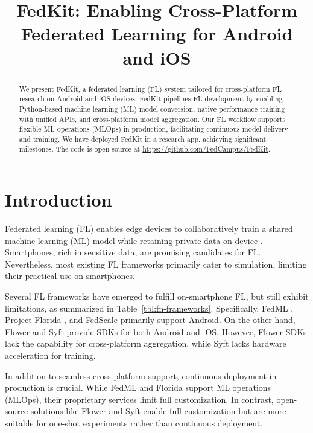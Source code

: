 \documentclass[letterpaper]{article} %
\title{FedKit: Enabling Cross-Platform Federated Learning for Android and iOS}
\author{}
\begin{document}
\maketitle

\begin{abstract}
    We present FedKit, a federated learning (FL) system tailored for
    cross-platform FL research on Android and iOS devices.
    FedKit pipelines FL development by
    enabling Python-based machine learning (ML) model conversion,
    native performance training with unified APIs,
    and cross-platform model aggregation.
    Our FL workflow supports flexible ML operations (MLOps) in production,
    facilitating continuous model delivery and training.
    We have deployed FedKit in a research app,
    achieving significant milestones.
    The code is open-source at \url{https://github.com/FedCampus/FedKit}.
\end{abstract}

\section{Introduction}

Federated learning (FL) enables edge devices to
collaboratively train a shared machine learning (ML) model while
retaining private data on device \cite{mcmahan2017communication}.
Smartphones, rich in sensitive data,
are promising candidates for FL.
Nevertheless, most existing FL frameworks
\cite[e.g.,][]{bonawitz2019towards,liu2021fate,ma2019paddlepaddle,openfl_citation}
primarily cater to simulation,
limiting their practical use on smartphones.

Several FL frameworks have emerged to fulfill on-smartphone FL,
but still exhibit limitations,
as summarized in Table~\ref{tbl:fn-frameworks}.
Specifically, FedML \cite{he2020fedml},
Project Florida \cite{madrigal2023project},
and FedScale \cite{lai2022fedscale} primarily support Android.
On the other hand,
Flower \cite{beutel2020flower,mathur2021ondevice} and
Syft \cite{ryffel2018generic,Ziller2021,hall2021syft}
provide SDKs for both Android and iOS.
However, Flower SDKs lack the capability for cross-platform aggregation,
while Syft lacks hardware acceleration for training.

In addition to seamless cross-platform support,
continuous deployment in production is crucial.
While FedML and Florida support ML operations (MLOps),
their proprietary services limit full customization.
In contrast, open-source solutions like Flower and Syft enable
full customization
but are more suitable for one-shot experiments rather than continuous deployment.
\end{document}
